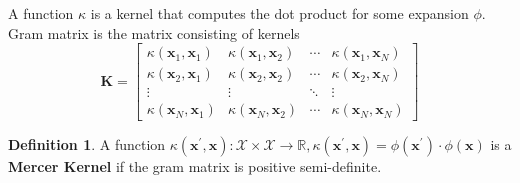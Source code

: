 \documentclass[11pt, %
	oneside, %
	english, %
	onehalfspacing, %
	parskip, %
	]{article} %
\theoremstyle{definition}
\newtheorem{definition}{Definition}
\begin{document}
A function $\kappa$ is a kernel that computes the dot product for some expansion $\phi$.
Gram matrix is the matrix consisting of kernels
\begin{equation*}
	\mathbf{K}=\left[\begin{array}{cccc}
		\kappa\left(\mathbf{x}_1, \mathbf{x}_1\right) & \kappa\left(\mathbf{x}_1, \mathbf{x}_2\right) & \cdots & \kappa\left(\mathbf{x}_1, \mathbf{x}_N\right) \\
		\kappa\left(\mathbf{x}_2, \mathbf{x}_1\right) & \kappa\left(\mathbf{x}_2, \mathbf{x}_2\right) & \cdots & \kappa\left(\mathbf{x}_2, \mathbf{x}_N\right) \\
		\vdots & \vdots & \ddots & \vdots \\
		\kappa\left(\mathbf{x}_N, \mathbf{x}_1\right) & \kappa\left(\mathbf{x}_N, \mathbf{x}_2\right) & \cdots & \kappa\left(\mathbf{x}_N, \mathbf{x}_N\right)
		\end{array}\right]
\end{equation*}

\begin{definition}
	A function $\kappa\left(\mathbf{x}^{\prime}, \mathbf{x}\right): \mathcal{X} \times \mathcal{X} \rightarrow \mathbb{R}, \kappa\left(\mathbf{x}^{\prime}, \mathbf{x}\right)=\phi\left(\mathbf{x}^{\prime}\right) \cdot \phi(\mathbf{x})$ is a \textbf{Mercer Kernel} if the gram matrix is positive semi-definite.
\end{definition}
\end{document}
